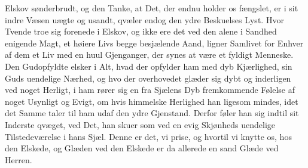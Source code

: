\documentclass[12pt,a4paper]{book}
\newcommand{\apage}[1]{\marginnote{\footnotesize\textit{[#1]}}}
\begin{document}
Elskov sønderbrudt, og den Tanke, at Det, der endnu holder os fængslet,
er i sit indre Væsen uægte og usandt, qvæler endog den ydre Beskuelses
Lyst. Hvor Tvende troe sig forenede i Elskov, og ikke ere det ved den
alene i Sandhed enigende Magt, et høiere Livs begge besjælende Aand,
ligner Samlivet for Enhver af dem et Liv med en huul Gjenganger, der
synes at være et fyldigt Menneske. Den Gudopfyldte elsker i Alt, hvad
der opfylder ham med dyb Kjærlighed, sin Guds uendelige Nærhed, og hvo
der overhovedet glæder sig dybt og inderligen ved noget Herligt, i ham
rører sig en fra Sjælens Dyb fremkommende Følelse af noget Usynligt og
Evigt, om hvis himmelske Herlighed han ligesom mindes, idet det Samme
taler til ham udaf den ydre Gjenstand. Derfor føler han sig indtil sit
Inderste qvæget, ved Det, han skuer som ved en evig Skjønheds \apage{9} uendelige
Tilstedeværelse i hans Sjæl. Denne er det, vi prise, og hvortil vi
knytte os, hos den Elskede, og Glæden ved den Elskede er da allerede en
sand Glæde ved Herren.
\end{document}
